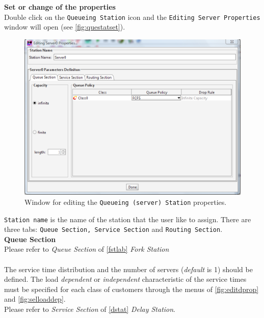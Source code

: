 \noindent \textbf{Set or change of the properties}\\
Double click on the \texttt{Queueing Station} icon and the
\texttt{Editing Server
Properties} window will open (see \autoref{fig:questatset}).\\
\begin{figure}[htb]
    \begin{center}
        \includegraphics[scale=.5]{img/jsimg/8.30.eps}
    \end{center}
    \caption{Window for editing the \texttt{Queueing (server) Station} properties.}
    \label{fig:questatset}
\end{figure}
\texttt{Station name} is the name of the station that the user
like to assign. There are three tabs: \texttt{Queue Section,
Service Section} and \texttt{Routing Section}.\\

\noindent \textbf{Queue Section}\\
Please refer to \emph{Queue Section} of \autoref{fstlab} \emph{Fork Station}\\


\\
The service time
distribution and the number of servers (\emph{default} is 1)
should be defined. The load \emph{dependent} or \emph{independent}
characteristic of the service times must be specified for each
class of customers through the menus of \autoref{fig:editdprop} and
\autoref{fig:selloaddep}.\\
Please refer to \emph{Service Section} of \autoref{dstat} \emph{Delay Station}.\\



